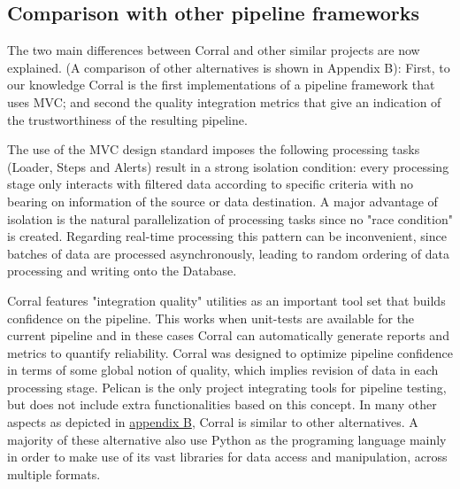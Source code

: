 \documentclass[a4paper,onecolumn,fleqn,usenatbib,useAMS]{mnrasr}
\newenvironment{frshaded}{%
\def\FrameCommand{\fboxrule=\FrameRule\fboxsep=\FrameSep \fcolorbox{framecolor}{shadecolor}}%
\MakeFramed {\FrameRestore}}%
{\endMakeFramed}
\begin{document}
\begin{frshaded}
\begin{multicols}{2} 
\section{Comparison with other pipeline frameworks}
\label{section:comparison}
%
The two main differences between Corral and other similar projects 
are now explained.
(A comparison of other alternatives is shown in Appendix B):
First, to our knowledge Corral is the first implementations of a 
pipeline framework that uses MVC; and second the quality integration 
metrics that give an indication of the trustworthiness of the resulting pipeline.

The use of the MVC design standard imposes the following processing 
tasks (Loader, Steps and Alerts) result in a strong isolation condition:
%
every processing stage only interacts with filtered data according 
to specific criteria  with no bearing on information of the source 
or data destination.
%
A major advantage of isolation is the natural parallelization of 
processing tasks since
no "race condition" is created.
%
%
Regarding real-time processing this pattern can be inconvenient, 
since batches of data are processed asynchronously, leading to 
random ordering of data processing and writing onto the Database.
%

Corral features "integration quality" utilities as
an important tool set that builds confidence on the pipeline.
%
This works when unit-tests are available for the current pipeline and 
in these cases Corral can automatically generate reports and metrics 
to quantify reliability.
%
Corral was designed to optimize pipeline confidence in terms of
some global notion of quality, which implies revision of data in each
processing stage.
%
Pelican is the only project integrating tools for pipeline testing, 
but does not include extra functionalities based on this concept.
%
In many other aspects as depicted in \hyperref[appendixb]{appendix B}, 
Corral is similar to other alternatives. A majority of these alternative 
also use Python as the programing language mainly in order to make use of
its vast libraries for data access and manipulation, across multiple formats.

\end{multicols}\end{frshaded}
 
\end{document}
